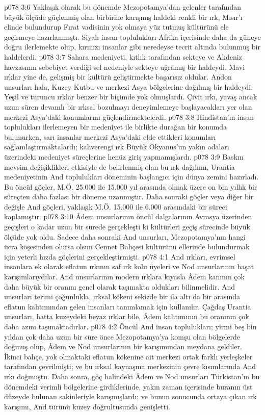 \vs p078 3:6 Yaklaşık olarak bu dönemde Mezopotamya’dan gelenler tarafından büyük ölçüde güçlenmiş olan birbirine karışmış haldeki renkli bir ırk, Mısır’ı elinde bulundurup Fırat vadisinin yok olmaya yüz tutmuş kültürünü ele geçirmeye hazırlanmıştı. Siyah insan toplulukları Afrika içerisinde daha da güneye doğru ilerlemekte olup, kırmızı insanlar gibi neredeyse tecrit altında bulunmuş bir haldelerdi.
\vs p078 3:7 Sahara medeniyeti, kıtlık tarafından sekteye ve Akdeniz havzasının sebebiyet verdiği sel nedeniyle sekteye uğramış bir haldeydi. Mavi ırklar yine de, gelişmiş bir kültürü geliştirmekte başarısız oldular. Andon unsurları hala, Kuzey Kutbu ve merkezi Asya bölgelerine dağılmış bir haldeydi. Yeşil ve turuncu ırklar benzer bir biçimde yok olmuşlardı. Çivit ırkı, yavaş ancak uzun süren devamlı bir ırksal bozulmayı deneyimlemeye başlayacakları yer olan merkezi Asya’daki konumlarını güçlendirmektelerdi.
\vs p078 3:8 Hindistan’ın insan toplulukları ilerlemeyen bir medeniyet ile birlikte durağan bir konumda bulunurken, sarı insanlar merkezi Asya’daki elde ettikleri konumları sağlamlaştırmaktalardı; kahverengi ırk Büyük Okyanus’un yakın adaları üzerindeki medeniyet süreçlerine henüz giriş yapmamışlardı.
\vs p078 3:9 Baskın mevsim değişiklikleri etkisiyle de belirlenmiş olan bu ırk dağılımı, Urantia medeniyetinin And toplulukları döneminin başlangıcı için dünya zemini hazırladı. Bu öncül göçler, M.Ö. 25.000 ile 15.000 yıl arasında olmak üzere on bin yıllık bir süreçten daha fazlası bir döneme uzanmıştır. Daha sonraki göçler veya diğer bir değişle And göçleri, yaklaşık M.Ö. 15.000 ile 6.000 arasındaki bir süreci kaplamıştır.
\vs p078 3:10 Âdem unsurlarının öncül dalgalarının Avrasya üzerinden geçişleri o kadar uzun bir sürede gerçekleşti ki kültürleri geçiş sürecinde büyük ölçüde yok oldu. Sadece daha sonraki And unsurları, Mezopotamya’nın hangi ücra köşesinden olursa olsun Cennet Bahçesi kültürünü ellerinde bulundurmak için yeterli hızda göçlerini gerçekleştirmişti.
\vs p078 4:1 And ırkları, evrimsel insanlara ek olarak eflatun ırkının saf ırk kolu üyeleri ve Nod unsurlarının başat karışımlarıydılar. And unsurlarının modern ırklara kıyasla Âdem kanının çok daha büyük bir oranını genel olarak taşımakta oldukları bilinmelidir. And unsurları terimi çoğunlukla, ırksal kökeni sekizde bir ila altı da bir arasında eflatun kalıtımından gelen insanları tanımlamak için kullanılır. Çağdaş Urantia unsurları, hatta kuzeydeki beyaz ırklar bile, Âdem kalıtımının bu oranının çok daha azını taşımaktadırlar.
\vs p078 4:2 Öncül And insan toplulukları; yirmi beş bin yıldan çok daha uzun bir süre önce Mezopotamya’ya komşu olan bölgelerde doğmuş olup, Âdem ve Nod unsurlarının bir karışımından meydana geldiler. İkinci bahçe, yok olmaktaki eflatun kökenine ait merkezi ortak farklı yerleşkeler tarafından çevrilmişti; ve bu ırksal kaynaşma merkezinin çevre kısımlarında And ırkı doğmuştu. Daha sonra, göç halindeki Âdem ve Nod unsurları Türkistan’ın bu dönemdeki verimli bölgelerine girdiklerinde, yakın zaman içerisinde buranın üst düzeyde bulunan sakinleriyle karışmışlardı; ve bunun sonucunda ortaya çıkan ırk karışımı, And türünü kuzey doğrultusunda genişletti.
